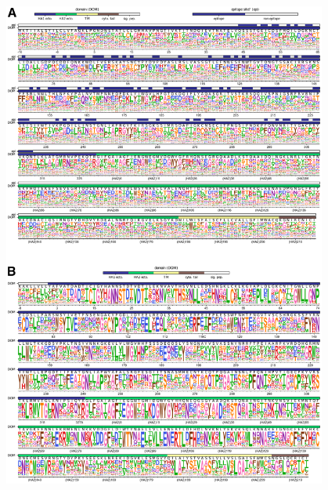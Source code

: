 \documentclass[9pt,twocolumn,twoside]{pnas-new}
\begin{document}
\begin{suppfigure}[H]
\centerline{\includegraphics[width=0.8\textwidth]{figs/supp_WSNprefs_logoplot/supp_logoplots.pdf}}
\caption{\label{suppfig:WSNprefs_logoplot}
{\bf The site-specific amino-acid preferences of the Perth/2009 H3 HA and the WSN/1933 H1 HA.}
(A) The un-scaled amino-acid preferences of the Perth/2009 H3 HA.
The overlays show the same information as in Figure~\ref{fig:logoplot} (domain, epitope site, and wildtype amino acid).
(B) The amino-acid preferences of the WSN/1933 H1 HA from~\cite{doud2016accurate} after taking the average of the experimental replicates and re-scaling~\cite{hilton2017phydms} by a stringency parameter of 2.05 (see \url{https://github.com/jbloomlab/dms_tools2/blob/master/examples/Doud2016/analysis_notebook.ipynb}).
The overlays show the same information as in Figure~\ref{fig:logoplot} (domain and wildtype amino acid).
Note that \cite{doud2016accurate} used libraries in which all codons were mutagenized \emph{except} for the one encoding N-terminal methionine.
Therefore, no data is shown for the first codon in the gene.
The sites are in H3 numbering for both logo plots.
}
\end{suppfigure}
\end{document}
